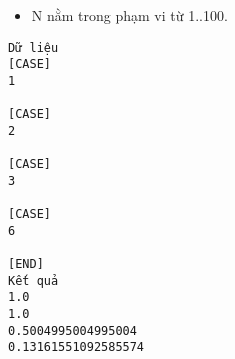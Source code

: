 \begin{itemize}
	\item     N nằm trong phạm vi từ 1..100.   
\end{itemize}
\begin{verbatim}
Dữ liệu
[CASE]
1

[CASE]
2

[CASE]
3

[CASE]
6

[END]
Kết quả
1.0
1.0
0.5004995004995004
0.13161551092585574
\end{verbatim}
